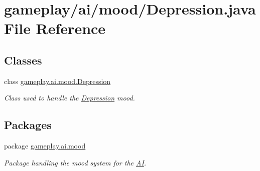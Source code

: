 \hypertarget{a00046}{\section{gameplay/ai/mood/\-Depression.java File Reference}
\label{a00046}
}
\subsection*{Classes}
\begin{DoxyCompactItemize}
\item 
class \hyperlink{a00008}{gameplay.\-ai.\-mood.\-Depression}
\begin{DoxyCompactList}\small\item\em Class used to handle the \hyperlink{a00008}{Depression} mood. \end{DoxyCompactList}\end{DoxyCompactItemize}
\subsection*{Packages}
\begin{DoxyCompactItemize}
\item 
package \hyperlink{a00083}{gameplay.\-ai.\-mood}
\begin{DoxyCompactList}\small\item\em Package handling the mood system for the \hyperlink{a00001}{A\-I}. \end{DoxyCompactList}\end{DoxyCompactItemize}
